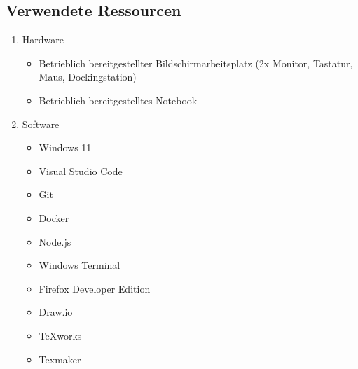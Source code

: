 \subsection{Verwendete Ressourcen}
\label{sec:Anhang:VerwendeteRessourcen}

\begin{enumerate}
    \item Hardware \\
    \begin{itemize}
        \item Betrieblich bereitgestellter Bildschirmarbeitsplatz (2x Monitor, Tastatur, Maus, Dockingstation)
        \item Betrieblich bereitgestelltes Notebook
    \end{itemize}
    \item Software \\
    \begin{itemize}
        \item Windows 11
        \item Visual Studio Code
        \item Git
        \item Docker
        \item Node.js
        \item Windows Terminal
        \item Firefox Developer Edition
        \item Draw.io
        \item TeXworks
        \item Texmaker
    \end{itemize}
\end{enumerate}
